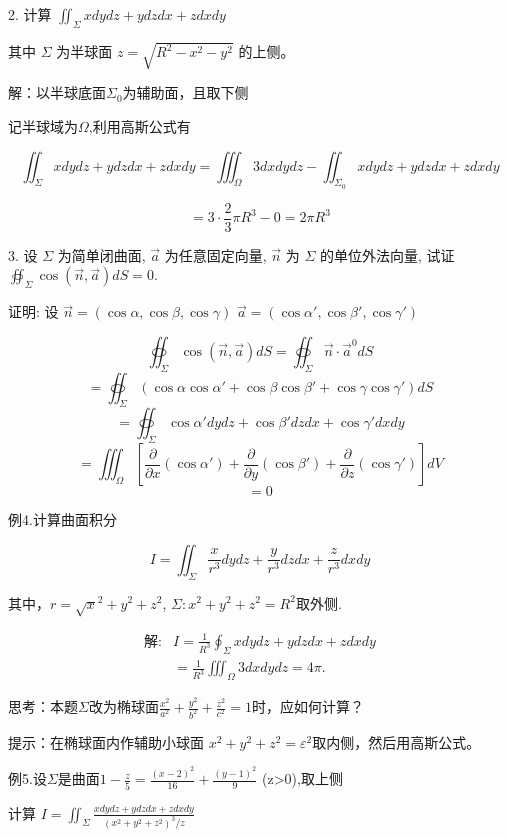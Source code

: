 \documentclass{article}
\begin{document}
\newpage

2. 计算 $\iint_{\Sigma} xdydz + ydzdx + zdxdy$

其中 $\Sigma$ 为半球面 $z = \sqrt{R^2 - x^2 - y^2}$ 的上侧。

解：以半球底面$\Sigma_0$为辅助面，且取下侧

记半球域为$\Omega$,利用高斯公式有

$$\iint_{\Sigma} xdydz + ydzdx + zdxdy=\iiint_\Omega3dxdydz-\iint_{\Sigma_0}xdydz+ydzdx+zdxdy$$

$$=3\cdot\frac{2}{3}\pi R^3-0=2\pi R^3$$

\newpage

3. 设 $\Sigma$ 为简单闭曲面, $\vec{a}$ 为任意固定向量, $\vec{n}$ 为 $\Sigma$ 的单位外法向量, 试证 $\oiint_{\Sigma} \cos(\vec{n}, \vec{a}) dS = 0.$

证明: 设 $\vec{n} = (\cos \alpha, \cos \beta, \cos \gamma)$
$\vec{a} = (\cos \alpha', \cos \beta', \cos \gamma')$

$$\oiint_{\Sigma} \cos(\vec{n}, \vec{a}) dS = \oiint_{\Sigma} \vec{n} \cdot \vec{a}^0 dS$$
$$= \oiint_{\Sigma} (\cos \alpha \cos \alpha' + \cos \beta \cos \beta' + \cos \gamma \cos \gamma') dS$$
$$= \oiint_{\Sigma} \cos \alpha' dydz + \cos \beta' dzdx + \cos \gamma' dxdy$$
$$= \iiint_{\Omega} \left[ \frac{\partial}{\partial x} (\cos \alpha') + \frac{\partial}{\partial y} (\cos \beta') + \frac{\partial}{\partial z} (\cos \gamma') \right] dV$$
$$=0$$


\newpage

例4.计算曲面积分

$$I=\iint_{\Sigma}\frac{x}{r^3}dydz+\frac{y}{r^3}dzdx+\frac{z}{r^3}dxdy$$

其中，$r= \sqrt x^2+ y^2+ z^2$, $\Sigma {: }x^2+ y^2+ z^2= R^2$取外侧.

$$\begin{aligned}\text{解:}&I=\frac{1}{R^{3}}\oint_{\Sigma}xdydz+ydzdx+zdxdy\\&=\frac{1}{R^{3}}\iiint_{\Omega}3dxdydz=4\pi.\end{aligned}$$

思考：本题$\Sigma$改为椭球面$\frac{x^2}{a^2}+\frac{y^2}{b^2}+\frac{z^2}{c^2}=1$时，应如何计算？

提示：在椭球面内作辅助小球面 $x^2+y^2+z^2=\varepsilon^2$取内侧，然后用高斯公式。

例5.设$\Sigma$是曲面$1-\frac z5=\frac{(x-2)^2}{16}+\frac{(y-1)^2}9$ (z>0),取上侧

计算 $I= \iint _\Sigma \frac {xdydz+ ydzdx+ zdxdy}{\left ( x^2+ y^2+ z^2\right ) ^3/ z}$
\end{document}
